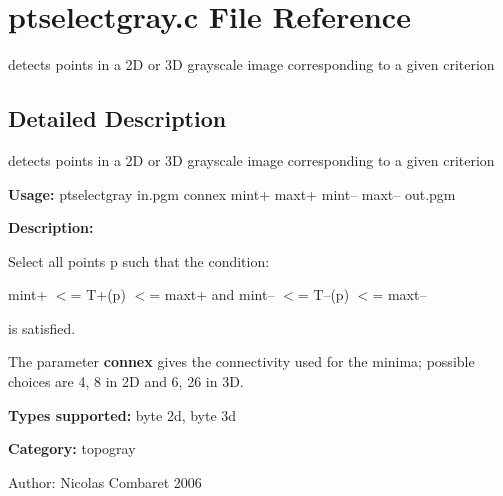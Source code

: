 \section{ptselectgray.c File Reference}
\label{ptselectgray_8c}
detects points in a 2D or 3D grayscale image corresponding to a given criterion  




\label{_details}
\subsection{Detailed Description}
detects points in a 2D or 3D grayscale image corresponding to a given criterion 

{\bf Usage:} ptselectgray in.pgm connex mint+ maxt+ mint-- maxt-- out.pgm

{\bf Description:}

Select all points p such that the condition:\par
 mint+ $<$= T+(p) $<$= maxt+ and mint-- $<$= T--(p) $<$= maxt--\par
 is satisfied.\par


The parameter {\bf connex} gives the connectivity used for the minima; possible choices are 4, 8 in 2D and 6, 26 in 3D.

{\bf Types supported:} byte 2d, byte 3d

{\bf Category:} topogray

\begin{Desc}
\item[Author:]Nicolas Combaret 2006 \end{Desc}
